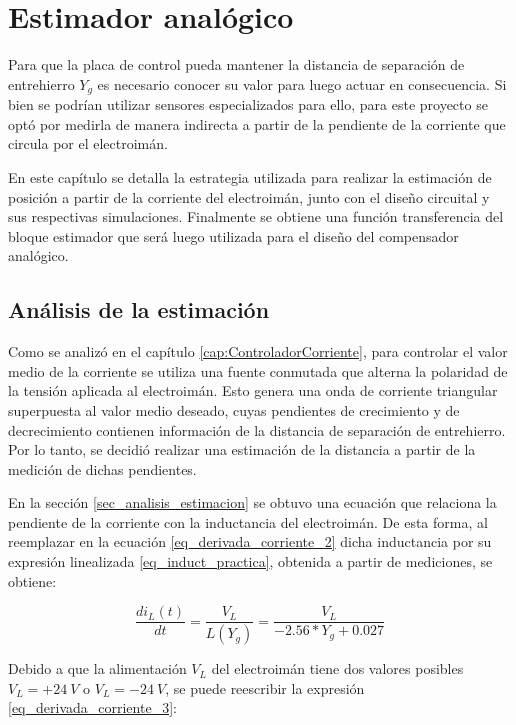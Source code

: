 \chapter{Estimador analógico}  \label{cap:Estimador Analogico}

Para que la placa de control pueda mantener la distancia de separación de entrehierro $Y_{g}$ es necesario conocer su valor para luego actuar en consecuencia. Si bien se podrían utilizar sensores  especializados para ello, para este proyecto se optó por medirla de manera indirecta a partir de la pendiente de la corriente que circula por el electroimán.

En este capítulo se detalla la estrategia utilizada para realizar la estimación de posición a partir de la corriente del electroimán, junto con el diseño circuital y sus respectivas simulaciones. Finalmente se obtiene una función transferencia del bloque estimador que será luego utilizada para el diseño del compensador analógico.

\section{Análisis de la estimación}\label{analisis_de_estimacion}

Como se analizó en el capítulo \ref{cap:ControladorCorriente}, para controlar el valor medio de la corriente se utiliza una fuente conmutada que alterna la polaridad de la tensión aplicada al electroimán. Esto genera una onda de corriente triangular superpuesta al valor medio deseado, cuyas pendientes de crecimiento y de decrecimiento contienen información de la distancia de separación de entrehierro. Por lo tanto, se decidió realizar una estimación de la distancia a partir de la medición de dichas pendientes.

En la sección \ref{sec_analisis_estimacion} se obtuvo una ecuación que relaciona la pendiente de la corriente con la inductancia del electroimán. De esta forma, al reemplazar en la ecuación \ref{eq_derivada_corriente_2} dicha inductancia por su expresión linealizada \ref{eq_induct_practica}, obtenida a partir de mediciones, se obtiene:

\begin{equation} \label{eq_derivada_corriente_3}
	\frac{di_L(t)}{dt}= \frac{V_L}{L(Y_g)}=\frac{V_L}{-2.56*Y_{g}+0.027}
\end{equation}

Debido a que la alimentación $V_L$ del electroimán tiene dos valores posibles $V_L=+24\:V$ o $V_L=-24\:V$, se puede reescribir la expresión \ref{eq_derivada_corriente_3}:

